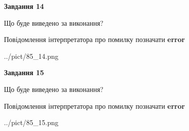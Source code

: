 \documentclass[11pt, ukrainian]{article}
\begin{document}
{\begin {large}
{\begin {center}\textbf{Завдання 14}\end {center}}\par
Що буде виведено за виконання? \par
Повідомлення інтерпретатора про помилку позначати \textbf{error}

\begin{center}
	{../pict/85_14.png}
\end{center}
\newpage

{\begin {center}\textbf{Завдання 15}\end {center}}\par
Що буде виведено за виконання? \par
Повідомлення інтерпретатора про помилку позначати \textbf{error}

\begin{center}
	{../pict/85_15.png}
\end{center}
\newpage

\end {large}}
\end{document}
